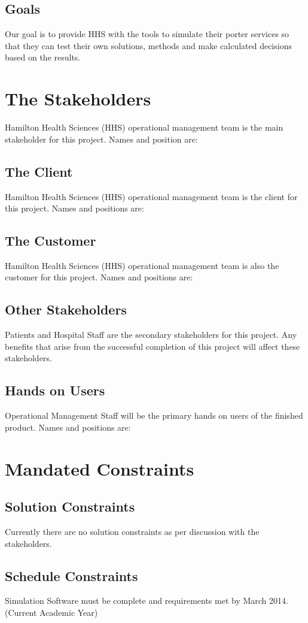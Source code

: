 \documentclass[paper=letter, fontsize=10pt]{scrartcl}
\numberwithin{equation}{section}		%
\numberwithin{figure}{section}			%
\numberwithin{table}{section}				%
\begin{document}
\subsection{Goals}
Our goal is to provide HHS with the tools to simulate their porter services so that they can test their own solutions, methods and make calculated decisions based on the results.

\section{The Stakeholders}
Hamilton Health Sciences (HHS) operational management team is the main stakeholder for this project. Names and position are: 
\subsection{The Client}
Hamilton Health Sciences (HHS) operational management team is the client for this project. Names and positions are:
\subsection{The Customer}
Hamilton Health Sciences (HHS) operational management team is also the customer for this project. Names and positions are:
\subsection{Other Stakeholders}
Patients and Hospital Staff are the secondary stakeholders for this project. Any benefits that arise from the successful completion of this project will affect these stakeholders.
\subsection{Hands on Users}
Operational Management Staff will be the primary hands on users of the finished product. Names and positions are:

\section{Mandated Constraints}
\subsection{Solution Constraints}
Currently there are no solution constraints as per discussion with the stakeholders.
\subsection{Schedule Constraints}
Simulation Software must be complete and requirements met by March 2014. (Current Academic Year)  
\end{document}
